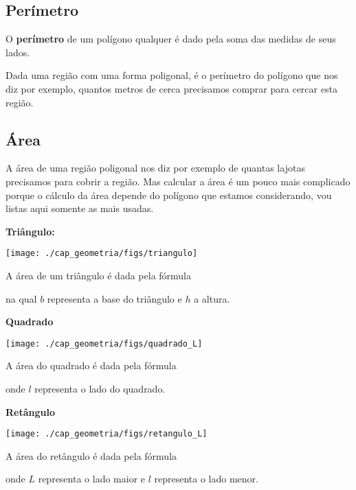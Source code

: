 \subsection{Perímetro}

\vskip0.3cm
 \colorbox{amarelo}{
 \begin{minipage}{0.9\linewidth}
 \begin{center}
  O \textbf{perímetro} de um polígono qualquer é dado pela soma das medidas de seus lados.
 \end{center}
 \end{minipage}}
 \vskip0.3cm


Dada uma região com uma forma poligonal, é o perímetro do polígono que nos diz por exemplo, quantos metros de cerca precisamos comprar para cercar esta região.

\subsection{Área}

A área de uma região poligonal nos diz por exemplo de quantas lajotas precisamos para cobrir a região. Mas calcular a área é um pouco mais complicado porque o cálculo da área depende do polígono que estamos considerando, vou listas aqui somente as mais usadas.

\newpage

\textbf{Triângulo:}
\begin{multicols}{2}

\texttt{[image: ./cap\_geometria/figs/triangulo]}

A área de um triângulo é dada pela fórmula


na qual $b$ representa a base do triângulo e $h$ a altura.
\end{multicols}

\textbf{Quadrado}
\begin{multicols}{2}
\texttt{[image: ./cap\_geometria/figs/quadrado\_L]}

A área do quadrado é dada pela fórmula


onde $l$ representa o lado do quadrado.
\end{multicols}

\textbf{Retângulo}
\begin{multicols}{2}
\texttt{[image: ./cap\_geometria/figs/retangulo\_L]}

A área do retângulo é dada pela fórmula


onde $L$ representa o lado maior e $l$ representa o lado menor.
\end{multicols}


